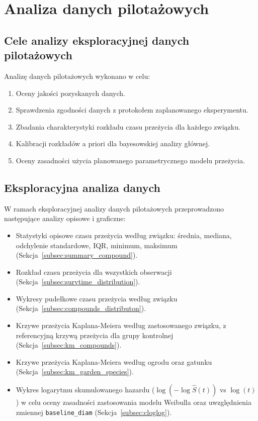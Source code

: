\documentclass[12pt, a4paper]{article}
\begin{document}
\section{Analiza danych pilotażowych}

\subsection{Cele analizy eksploracyjnej danych pilotażowych}
Analizę danych pilotażowych wykonano w celu:
\begin{enumerate}[noitemsep]
    \item Oceny jakości pozyskanych danych.
    \item Sprawdzenia zgodności danych z protokołem zaplanowanego eksperymentu.
    \item Zbadania charakterystyki rozkładu czasu przeżycia dla każdego związku.
    \item Kalibracji rozkładów a priori dla bayesowskiej analizy głównej.
    \item Oceny zasadności użycia planowanego parametrycznego modelu przeżycia.
\end{enumerate}

\subsection{Eksploracyjna analiza danych}

W ramach eksploracyjnej analizy danych pilotażowych przeprowadzono następujące analizy opisowe i graficzne:

\begin{itemize}[noitemsep]
    \item Statystyki opisowe czasu przeżycia według związku: średnia, mediana, odchylenie standardowe, IQR, minimum, maksimum (Sekcja~\ref{subsec:summary_compound}). 
    \item Rozkład czasu przeżycia dla wszystkich obserwacji (Sekcja~\ref{subsec:survtime_distribution}).
    \item Wykresy pudełkowe czasu przeżycia według związku (Sekcja~\ref{subsec:compounds_distributon}).
    \item Krzywe przeżycia Kaplana-Meiera według zastosowanego związku, z referencyjną krzywą przeżycia dla grupy kontrolnej (Sekcja~\ref{subsec:km_compounds}).
    \item Krzywe przeżycia Kaplana-Meiera według ogrodu oraz gatunku (Sekcja~\ref{subsec:km_garden_species}).
    \item Wykres logarytmu skumulowanego hazardu ($\log(-\log \hat{S}(t))$ vs $\log(t)$) w celu oceny zasadności zastosowania modelu Weibulla oraz uwzględnienia zmiennej \texttt{baseline\_diam} (Sekcja~\ref{subsec:cloglog}).
\end{itemize}
\end{document}
